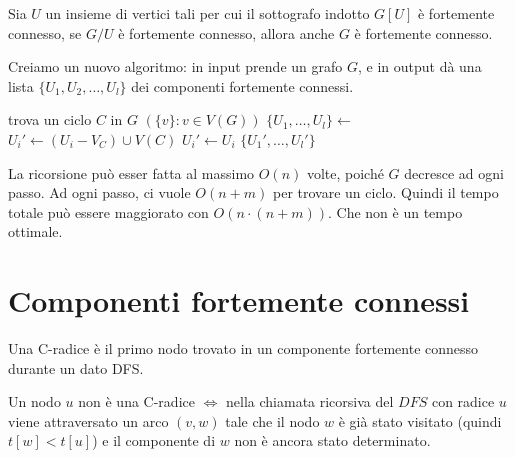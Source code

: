 \begin{prop}
Sia $U$ un insieme di vertici tali per cui il sottografo indotto $G[U]$ \`e fortemente connesso, se $G / U$ \`e fortemente connesso, allora anche $G$ \`e fortemente connesso.
\end{prop}

Creiamo un nuovo algoritmo: in input prende un grafo $G$, e in output d\`a una lista $\{ U_1, U_2, \ldots, U_l \}$ dei componenti fortemente connessi.

\begin{algorithm}
\caption{Come \emph{non} trovare i componenti fortemente connessi}
\begin{algorithmic}[1]
    \State trova un ciclo $C$ in $G$
        \State \Return $(\{ v \} : v \in V(G))$
    \EndIf
    \State $\{ U_1, \ldots, U_l \} \gets$ 
            \State $U_i' \gets (U_i - V_C) \cup V(C)$
        \Else
            \State $U_i' \gets U_i$
        \EndIf
    \EndFor
    \State \Return $\{ U_1', \ldots, U_l' \}$
\EndFunction
\end{algorithmic}
\end{algorithm}

La ricorsione pu\`o esser fatta al massimo $O(n)$ volte, poich\'e $G$ decresce ad ogni passo. Ad ogni passo, ci vuole $O(n + m)$ per trovare un ciclo. Quindi il tempo totale pu\`o essere maggiorato con $O(n \cdot (n + m))$. Che non \`e un tempo ottimale.

\section{Componenti fortemente connessi}

\begin{defn}[C-radice]
Una C-radice \`e il primo nodo trovato in un componente fortemente connesso durante un dato DFS.
\end{defn}

\begin{prop}
Un nodo $u$ non \`e una C-radice $\iff$ nella chiamata ricorsiva del $DFS$ con radice $u$ viene attraversato un arco $(v,w)$ tale che il nodo $w$ \`e gi\`a stato visitato (quindi $t[w] < t[u]$) e il componente di $w$ non \`e ancora stato determinato.
\end{prop}

